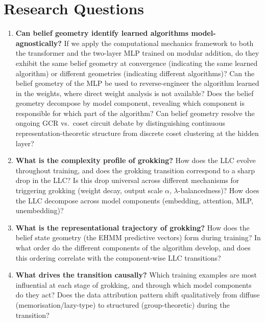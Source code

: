 \documentclass[11pt,a4paper]{article}
\begin{document}
\section{Research Questions}

\begin{enumerate}[label=\textbf{RQ\arabic*.}, leftmargin=2.5em]
    \item \textbf{Can belief geometry identify learned algorithms model-agnostically?} If we apply the computational mechanics framework to both the transformer and the two-layer MLP trained on modular addition, do they exhibit the same belief geometry at convergence (indicating the same learned algorithm) or different geometries (indicating different algorithms)? Can the belief geometry of the MLP be used to reverse-engineer the algorithm learned in the weights, where direct weight analysis is not available? Does the belief geometry decompose by model component, revealing which component is responsible for which part of the algorithm? Can belief geometry resolve the ongoing GCR vs.\ coset circuit debate \citep{chughtai2023toy, stander2024grokking, wu2024unified} by distinguishing continuous representation-theoretic structure from discrete coset clustering at the hidden layer?

    \item \textbf{What is the complexity profile of grokking?} How does the LLC evolve throughout training, and does the grokking transition correspond to a sharp drop in the LLC? Is this drop universal across different mechanisms for triggering grokking (weight decay, output scale $\alpha$, $\lambda$-balancedness)? How does the LLC decompose across model components (embedding, attention, MLP, unembedding)?

    \item \textbf{What is the representational trajectory of grokking?} How does the belief state geometry (the EHMM predictive vectors) form during training? In what order do the different components of the algorithm develop, and does this ordering correlate with the component-wise LLC transitions?

    \item \textbf{What drives the transition causally?} Which training examples are most influential at each stage of grokking, and through which model components do they act? Does the data attribution pattern shift qualitatively from diffuse (memorisation/lazy-type) to structured (group-theoretic) during the transition?


\end{enumerate}
\end{document}
